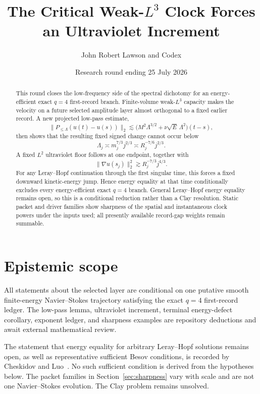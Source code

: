 \documentclass[11pt]{article}
\title{The Critical Weak-\(L^3\) Clock Forces an Ultraviolet Increment}
\author{John Robert Lawson and Codex}
\date{Research round ending 25 July 2026}
\theoremstyle{remark}
\begin{document}
\maketitle

\begin{abstract}
This round closes the low-frequency side of the spectral dichotomy for
an energy-efficient exact \(q=4\) first-record branch.  Finite-volume
weak-\(L^3\) capacity makes the velocity on a future selected amplitude
layer almost orthogonal to a fixed earlier record.  A new projected
low-pass estimate,
\[
 \|P_{\leq\Lambda}(u(t)-u(s))\|_2
 \lesssim
 \bigl(M^2\Lambda^{3/2}
       +\nu\sqrt E\,\Lambda^2\bigr)(t-s),
\]
then shows that the resulting fixed signed change cannot occur below
\[
 \Lambda_j\asymp
 m_j^{7/3}j^{2/3}
 \asymp R_j^{-7/6}j^{2/3}.
\]
A fixed \(L^2\) ultraviolet floor follows at one endpoint, together with
\[
 \|\nabla u(s_j)\|_2^2
 \gtrsim R_j^{-7/3}j^{4/3}.
\]
For any Leray--Hopf continuation through the first singular time, this
forces a fixed downward kinetic-energy jump.  Hence energy equality at
that time conditionally excludes every energy-efficient exact \(q=4\)
branch.  General Leray--Hopf energy equality remains open, so this is a
conditional reduction rather than a Clay resolution.  Static packet and
driver families show sharpness of the spatial and instantaneous clock
powers under the inputs used; all presently available record-gap weights
remain summable.
\end{abstract}

\section{Epistemic scope}

All statements about the selected layer are conditional on one putative
smooth finite-energy Navier--Stokes trajectory satisfying the exact
\(q=4\) first-record ledger.  The low-pass lemma, ultraviolet increment,
terminal energy-defect corollary, exponent ledger, and sharpness examples
are repository deductions and await external mathematical review.

The statement that energy equality for arbitrary Leray--Hopf solutions
remains open, as well as representative sufficient Besov conditions, is
recorded by Cheskidov and Luo~\cite{CL20}.  No such sufficient condition
is derived from the hypotheses below.  The packet families in
Section~\ref{sec:sharpness} vary with scale and are not one
Navier--Stokes evolution.  The Clay problem remains unsolved.
\end{document}
